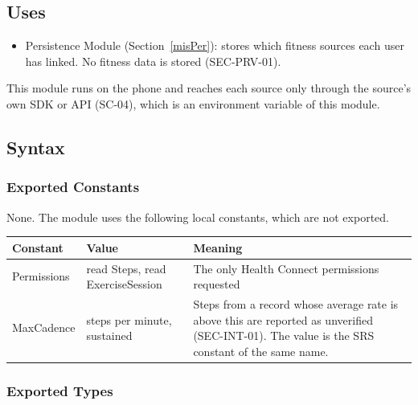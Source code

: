 \documentclass[12pt, titlepage]{article}
\begin{document}
\subsection{Uses}

\begin{itemize}
    \item Persistence Module (Section~\ref{misPer}): stores which fitness
      sources each user has linked. No fitness data is stored (SEC-PRV-01).
\end{itemize}

\noindent This module runs on the phone and reaches each source only
through the source's own SDK or API (SC-04), which is an environment variable
of this module.

\subsection{Syntax}

\subsubsection{Exported Constants}

None. The module uses the following local constants, which are not exported.

\begin{center}
\renewcommand{\arraystretch}{1.2}
\begin{tabular}{l >{\raggedright\arraybackslash}p{3.6cm}
  >{\raggedright\arraybackslash}p{6.8cm}}
\toprule
\textbf{Constant} & \textbf{Value} & \textbf{Meaning}\\
\midrule
\textsf{Permissions} & read Steps, read ExerciseSession & The only Health
  Connect permissions requested\\
\textsf{MaxCadence} & 250 steps per minute, sustained & Steps from a
  record whose average rate is above this are reported as unverified
  (SEC-INT-01). The value is the SRS constant of the same name.\\
\bottomrule
\end{tabular}
\end{center}

\subsubsection{Exported Types}
\end{document}
